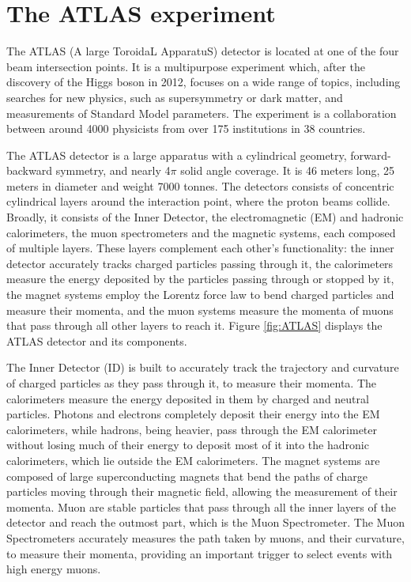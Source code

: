 \documentclass[12pt,a4paper,openright,twoside]{report}
\begin{document}
\section{The ATLAS experiment}
The ATLAS (A large ToroidaL ApparatuS) detector is located at one of the four beam intersection points. It is a multipurpose experiment which, after the discovery of the Higgs boson in 2012, focuses on a wide range of topics, including searches for new physics, such as supersymmetry or dark matter, and measurements of Standard Model parameters. The experiment is a collaboration between around 4000 physicists from over 175 institutions in 38 countries.

The ATLAS detector is a large apparatus with a cylindrical geometry, forward-backward symmetry, and nearly 4$\pi$ solid angle coverage. It is 46 meters long, 25 meters in diameter and weight 7000 tonnes. The detectors consists of concentric cylindrical layers around the interaction point, where the proton beams collide. Broadly, it consists of the  Inner Detector, the electromagnetic (EM) and hadronic calorimeters, the muon spectrometers and the magnetic systems, each composed of multiple layers. These layers complement each other's functionality: the inner detector accurately tracks charged particles passing through it, the calorimeters measure the energy deposited by the particles passing through or stopped by it, the magnet systems employ the Lorentz force law to bend charged particles and measure their momenta, and the muon systems measure the momenta of muons that pass through all other layers to reach it. Figure \ref{fig:ATLAS} displays the ATLAS detector and its components.

The Inner Detector (ID) is built to accurately track the trajectory and curvature of charged particles as they pass through it, to measure their momenta. The calorimeters measure the energy deposited in them by charged and neutral particles. Photons and electrons completely deposit their energy into the EM calorimeters, while hadrons, being heavier, pass through the EM calorimeter without losing much of their energy to deposit most of it into the hadronic calorimeters, which lie outside the EM calorimeters. The magnet systems are composed of large superconducting magnets that bend the paths of charge particles moving through their magnetic field, allowing the measurement of their momenta. Muon are stable particles that pass through all the inner layers of the detector and reach the outmost part, which is the Muon Spectrometer. The Muon Spectrometers accurately measures the path taken by muons, and their curvature, to measure their momenta, providing an important trigger to select events with high energy muons. 
\end{document}
